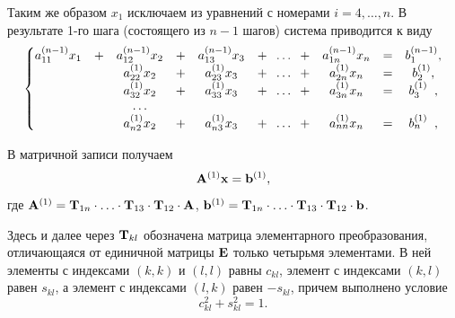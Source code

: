 \documentclass[12pt]{article}
\begin{document}
	Таким же образом $x_1$ исключаем из уравнений с номерами $i=4,\ldots, n$. В результате 1-го шага (состоящего из $n-1$ шагов) система приводится к виду
	\begin{equation}
		\begin{gathered}
			\left\{
			\begin{matrix}
				a_{11}^{\left(n-1\right)}x_1 &+ &a_{12}^{\left(n-1\right)}x_2 &+ &a_{13}^{\left(n-1\right)}x_3&+\hspace{2mm}\ldots\hspace{2mm}+&a_{1n}^{\left(n-1\right)}x_n & = &b_{1}^{\left(n-1\right)},\\
				&&a_{22}^{\left(1\right)}x_2&+&a_{23}^{\left(1\right)}x_3&+\hspace{2mm}\ldots\hspace{2mm}+&a_{2n}^{\left(1\right)}x_n&=&b_{2}^{\left(1\right)},\\
				 &  & a_{32}^{\left(1\right)}x_2 & + & a_{33}^{\left(1\right)}x_3 & +\hspace{2mm}\ldots \hspace{2mm}+ &a_{3n}^{\left(1\right)}x_n&=&b_{3}^{\left(1\right)}\hspace{1.9mm},\\
				&&\ldots\\
				&  & a_{n2}^{\left(1\right)}x_2 & + & a_{n3}^{\left(1\right)}x_3 & +\hspace{2mm}\ldots \hspace{2mm}+ &a_{nn}^{\left(1\right)}x_n&=&b_{n}^{\left(1\right)}\hspace{1.9mm},
			\end{matrix}
			\right.
		\end{gathered}\label{fm10}
	\end{equation}
	
	В матричной записи получаем
	\begin{equation}
		\bold{A}^{\left(1\right)}\bold{x}=\bold{b}^{\left(1\right)},
	\end{equation}
	где $\bold{A}^{\left(1\right)}=\bold{T}_{1n}\cdot\ldots\cdot \bold T_{13}\cdot \bold T_{12}\cdot \bold{A}$, $\bold b^{\left(1\right)}=\bold{T}_{1n}\cdot\ldots\cdot \bold T_{13}\cdot \bold T_{12} \cdot \bold{b}$.
	
	Здесь и далее через $\bold{T}_{kl}$ обозначена матрица элементарного преобразования, отличающаяся от единичной матрицы $\bold{E}$ только четырьмя элементами. В ней элементы с индексами $\left(k,k\right)$ и $\left(l,l\right)$ равны $c_{kl}$, элемент с индексами $\left(k,l\right)$ равен $s_{kl}$, а элемент с индексами $\left(l,k\right)$ равен $-s_{kl}$, причем выполнено условие
	\begin{equation}
		c_{kl}^2+s_{kl}^{2}=1.\label{fm12}
	\end{equation}
	
\end{document}

